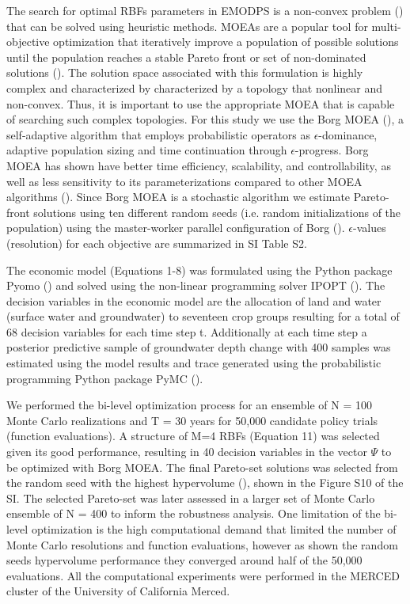 \documentclass[11pt,a4paper]{article}
\begin{document}
The search for  optimal RBFs parameters in EMODPS is a non-convex problem (\cite{giuliani_curses_2016}) that can be solved using heuristic methods. MOEAs are a popular tool for multi-objective optimization that iteratively improve a population of possible solutions  until the population reaches a stable Pareto front or set of  non-dominated solutions (\cite{coello_evolutionary_2007}). The solution space associated with this formulation is highly complex and characterized by characterized by a topology that nonlinear and non-convex. Thus, it is important to use the appropriate MOEA that is capable of searching such complex topologies. For this study we use the Borg MOEA (\cite{hadka_borg_2013}), a self-adaptive algorithm that employs probabilistic operators as $\epsilon$-dominance, adaptive population sizing and time continuation through $\epsilon$-progress. Borg MOEA has shown have better time efficiency, scalability, and controllability, as well as less sensitivity to its parameterizations compared to other MOEA algorithms (\cite{reed_evolutionary_2013,gupta_can_2020,zatarain_salazar_balancing_2017}). Since Borg MOEA is a stochastic algorithm we estimate Pareto-front solutions using ten different random seeds (i.e.  random initializations of the population) using the master-worker parallel configuration of Borg (\cite{hadka_large-scale_2015}). $\epsilon$-values (resolution) for each objective are summarized in SI Table S2. 


The economic model (Equations 1-8) was formulated using the Python package Pyomo (\cite{hart_pyomo_2011}) and solved using the non-linear programming solver IPOPT (\cite{wachter_implementation_2006}). The decision variables in the economic model are the allocation of land and water (surface water and groundwater) to seventeen crop groups resulting for a total of 68 decision variables for each time step t. Additionally at each time step a posterior predictive sample of groundwater depth change with 400 samples was estimated using the model results and trace generated using the probabilistic programming Python package PyMC  (\cite{salvatier_probabilistic_2016}).

We performed the bi-level optimization process for an ensemble of N = 100 Monte Carlo realizations and T = 30 years for 50,000 candidate policy trials (function evaluations). A structure of M=4 RBFs (Equation 11) was selected given its good performance, resulting in 40 decision variables in the vector  $\Psi$ to be optimized with Borg MOEA. The final Pareto-set solutions was selected from the random seed with the highest hypervolume (\cite{hadka_large-scale_2015,reed_evolutionary_2013}), shown in the Figure S10 of the SI. The selected Pareto-set was later assessed in a larger set of Monte Carlo ensemble of N = 400 to inform the robustness analysis. One limitation of the bi-level optimization is the high computational demand that limited the number of Monte Carlo resolutions and function evaluations, however as shown the random seeds hypervolume performance they converged around half of the 50,000 evaluations. All the computational experiments were performed in the MERCED cluster of the University of California Merced. 
\end{document}
